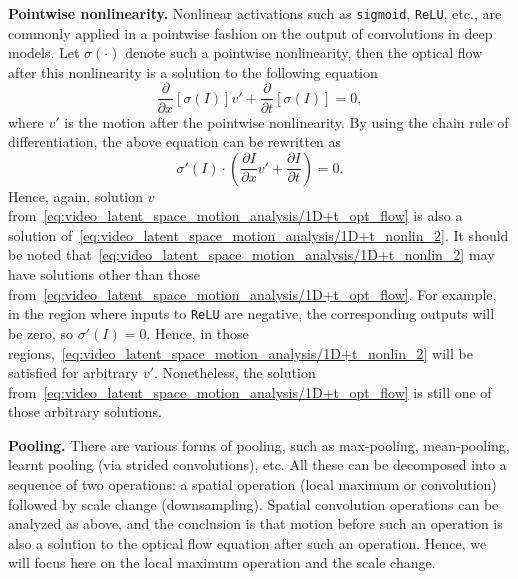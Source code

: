 \textbf{Pointwise nonlinearity.} Nonlinear activations such as \texttt{sigmoid}, \texttt{ReLU}, etc., are commonly applied in a pointwise fashion on the output of convolutions in deep models. Let $\sigma(\cdot)$ denote such a pointwise nonlinearity, then the optical flow after this nonlinearity is a solution to the following equation
\begin{equation}
    \frac{\partial}{\partial x}\left[\sigma(I)\right]v'  + \frac{\partial}{\partial t}\left[\sigma(I)\right] = 0,
    \label{eq:video_latent_space_motion_analysis/1D+t_nonlin}
\end{equation}
where $v'$ is the motion after the pointwise nonlinearity. By using the chain rule of differentiation, the above equation can be rewritten as
\begin{equation}
    \sigma'(I)\cdot \left(\frac{\partial I}{\partial x}v'  + \frac{\partial I}{\partial t} \right) = 0.
    \label{eq:video_latent_space_motion_analysis/1D+t_nonlin_2}
\end{equation}
Hence, again, solution $v$ from~\cref{eq:video_latent_space_motion_analysis/1D+t_opt_flow} is also a solution of~\cref{eq:video_latent_space_motion_analysis/1D+t_nonlin_2}. It should be noted that~\cref{eq:video_latent_space_motion_analysis/1D+t_nonlin_2} may have solutions other than those from~\cref{eq:video_latent_space_motion_analysis/1D+t_opt_flow}. For example, in the region where inputs to \texttt{ReLU} are negative, the corresponding outputs will be zero, so $\sigma'(I)=0$. Hence, in those regions,~\cref{eq:video_latent_space_motion_analysis/1D+t_nonlin_2} will be satisfied for arbitrary $v'$. Nonetheless, the solution from~\cref{eq:video_latent_space_motion_analysis/1D+t_opt_flow} is still one of those arbitrary solutions.

\textbf{Pooling.} There are various forms of pooling, such as max-pooling, mean-pooling, learnt pooling (via strided convolutions), etc. All these can be decomposed into a sequence of two operations: a spatial operation (local maximum or convolution) followed by scale change (downsampling). Spatial convolution operations can be analyzed as above, and the conclusion is that motion before such an operation is also a solution to the optical flow equation after such an operation. Hence, we will focus here on the local maximum operation and the scale change.

